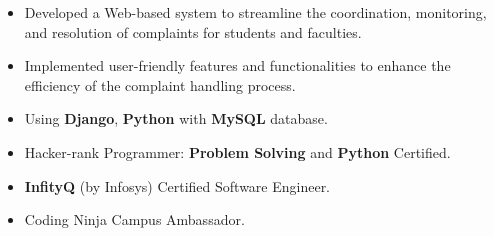 \documentclass[12pt,a4paper]{altacv}
\begin{document}
\medskip


\begin{itemize}
\item {\small Developed a Web-based system to streamline the coordination, monitoring, and resolution of complaints for students and faculties.}
\item {\small Implemented user-friendly features and functionalities to enhance the efficiency of the complaint handling process.}
\item {\smallImplemented Using \textbf{Django}, \textbf{Python} with \textbf{MySQL} database.}
\end{itemize}

\medskip



\begin{itemize}
\item {\small Hacker-rank Programmer: \textbf{Problem Solving} and \textbf{Python} Certified.}
\item {\small \textbf{InfityQ} (by Infosys) Certified Software Engineer.}
\item {\small Coding Ninja Campus Ambassador.}
\end{itemize}



\smallskip

\end{document}
